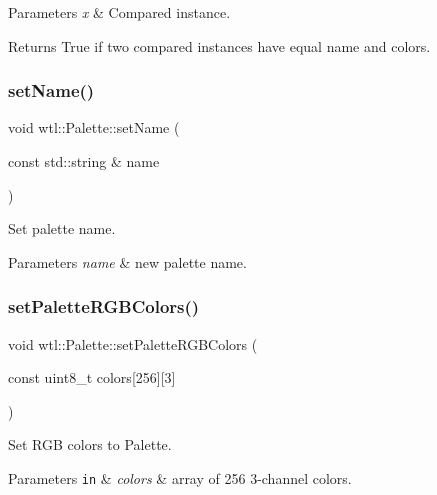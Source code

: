 \begin{DoxyParams}{Parameters}
{\em x} & Compared instance. \\
\hline
\end{DoxyParams}
\begin{DoxyReturn}{Returns}
True if two compared instances have equal name and colors. 
\end{DoxyReturn}
\mbox{\label{classwtl_1_1_palette_a50c0f821a8365ad59974841a6a9030e4}} 
\subsubsection{\texorpdfstring{set\+Name()}{setName()}}
{\footnotesize\ttfamily void wtl\+::\+Palette\+::set\+Name (\begin{DoxyParamCaption}\item[{const std\+::string \&}]{name }\end{DoxyParamCaption})}



Set palette name. 


\begin{DoxyParams}{Parameters}
{\em name} & new palette name. \\
\hline
\end{DoxyParams}
\mbox{\label{classwtl_1_1_palette_a249fabbd46ae920339334610da724690}} 
\subsubsection{\texorpdfstring{set\+Palette\+R\+G\+B\+Colors()}{setPaletteRGBColors()}}
{\footnotesize\ttfamily void wtl\+::\+Palette\+::set\+Palette\+R\+G\+B\+Colors (\begin{DoxyParamCaption}\item[{const uint8\+\_\+t}]{colors\mbox{[}256\mbox{]}\mbox{[}3\mbox{]} }\end{DoxyParamCaption})}



Set R\+GB colors to Palette. 


\begin{DoxyParams}[1]{Parameters}
\mbox{\tt in}  & {\em colors} & array of 256 3-\/channel colors. \\
\hline
\end{DoxyParams}
\mbox{\label{classwtl_1_1_palette_aac6a445b9edc9a80d1433cffc299ad4c}} 

